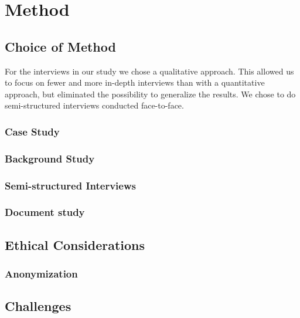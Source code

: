 \chapter{Method}

\section{Choice of Method}

For the interviews in our study we chose a qualitative approach. This allowed us to focus on fewer and more in-depth interviews than with a quantitative approach, but eliminated the possibility to generalize the results. We chose to do semi-structured interviews conducted face-to-face. 

\subsection{Case Study}
\subsection{Background Study}
\subsection{Semi-structured Interviews}
\subsection{Document study}

\section{Ethical Considerations}
\subsection{Anonymization}

\section{Challenges}